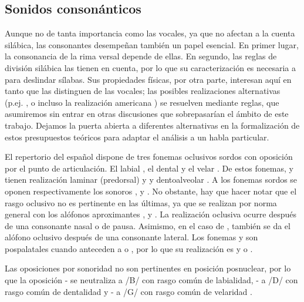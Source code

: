 \subsection{Sonidos consonánticos}
Aunque no de tanta importancia como las vocales, ya que no afectan a la cuenta silábica, las consonantes desempeñan también un papel esencial. En primer lugar, la consonancia de la rima versal depende de ellas. En segundo, las reglas de división silábica las tienen en cuenta, por lo que su caracterización es necesaria a para deslindar sílabas. Sus propiedades físicas, por otra parte, interesan aquí en tanto que las distinguen de las vocales; las posibles realizaciones alternativas (p.ej. ,  o incluso la realización americana ) se resuelven mediante reglas, que asumiremos sin entrar en otras discusiones que sobrepasarían el ámbito de este trabajo. Dejamos la puerta abierta a diferentes alternativas en la formalización de estos presupuestos teóricos para adaptar el análisis a un habla particular.

El repertorio del español dispone de tres fonemas oclusivos sordos con oposición por el punto de articulación. El labial , el dental  y el velar  \parencite[194-195]{quilis2019}.  De estos fonemas,  y  tienen realización laminar (predorsal) y \ipa{[t̪]} y \ipa{[d̪]} dentoalveolar \parencite[257]{martinez2003}. A los fonemas sordos se oponen respectivamente los sonoros ,  y . No obstante, hay que hacer notar que el rasgo oclusivo no es pertinente en las últimas, ya que se realizan por norma general con los alófonos aproximantes \ipa{[β̞]}, \ipa{[ð̞]} y \ipa{[ɣ̞]} \parencite[79-132]{navarrotomas2004}. La realización oclusiva ocurre después de una consonante nasal o de pausa. Asimismo, en el caso de , también se da el alófono oclusivo después de una consonante lateral. Los fonemas  y  son pospalatales cuando anteceden a  o , por lo que su realización es \ipa{[k̞]} y \ipa{[g̞]} o \ipa{[ɣ̞]} \parencite[20-21]{canellada1987}.

Las oposiciones por sonoridad no son pertinentes en posición posnuclear, por lo que la oposición - se neutraliza a /B/ con rasgo común de labialidad, - a /D/ con rasgo común de dentalidad y - a /G/ con rasgo común de velaridad \parencite[205]{quilis2019}.
 
